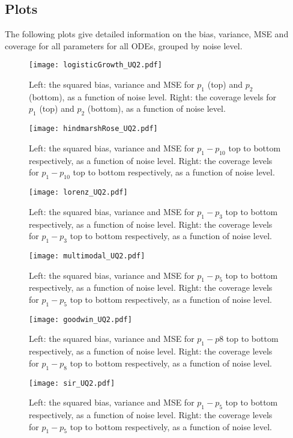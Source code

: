 \subsection{Plots}
The following plots give detailed information on the bias, variance, MSE and coverage for all parameters for all ODEs, grouped by noise level.
\begin{figure}[H]
	\texttt{[image: logisticGrowth\_UQ2.pdf]}
	\caption{Left: the squared bias, variance and MSE for $p_1$ (top) and $p_2$ (bottom), as a function of noise level. Right: the coverage levels for $p_1$ (top) and $p_2$ (bottom), as a function of noise level.}
	\label{fig:logisticSup}
\end{figure}
\begin{figure}[H]
	\texttt{[image: hindmarshRose\_UQ2.pdf]}
	\caption{Left: the squared bias, variance and MSE for $p_1 - p_{10}$ top to bottom respectively, as a function of noise level. Right: the coverage levels for $p_1 - p_{10}$ top to bottom respectively, as a function of noise level.}
	\label{fig:hindmarshSup}
\end{figure}
\begin{figure}[H]
	\texttt{[image: lorenz\_UQ2.pdf]}
	\caption{Left: the squared bias, variance and MSE for $p_1 - p_3$ top to bottom respectively, as a function of noise level. Right: the coverage levels for $p_1 - p_3$ top to bottom respectively, as a function of noise level.}
	\label{fig:lorenzSup}
\end{figure}
\begin{figure}[H]
	\texttt{[image: multimodal\_UQ2.pdf]}
	\caption{Left: the squared bias, variance and MSE for $p_1 - p_5$ top to bottom respectively, as a function of noise level. Right: the coverage levels for $p_1 - p_5$ top to bottom respectively, as a function of noise level.}
	\label{fig:multimodalSup}
\end{figure}
\begin{figure}[H]
	\texttt{[image: goodwin\_UQ2.pdf]}
	\caption{Left: the squared bias, variance and MSE for $p_1 - p8$ top to bottom respectively, as a function of noise level. Right: the coverage levels for $p_1 - p_8$ top to bottom respectively, as a function of noise level.}
	\label{fig:goodwinSup}
\end{figure}
\begin{figure}[H]
	\texttt{[image: sir\_UQ2.pdf]}
	\caption{Left: the squared bias, variance and MSE for $p_1 - p_5$ top to bottom respectively, as a function of noise level. Right: the coverage levels for $p_1 - p_5$ top to bottom respectively, as a function of noise level.}
	\label{fig:sirSup}
\end{figure}

